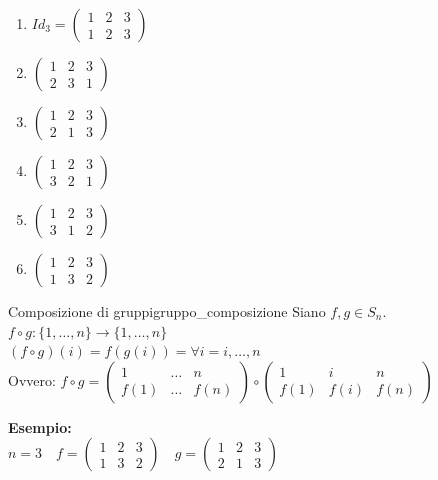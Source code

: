 \documentclass[12pt, letterpaper]{report}
\newcounter{definition}
\newcommand{\nmu}{}
\begin{document}
		\begin{enumerate}
			\item $Id_3 = \begin{pmatrix}
				1 & 2 & 3 \\
				1 & 2 & 3
			\end{pmatrix}$
			\item $\begin{pmatrix}
				1 & 2 & 3 \\
				2 & 3 & 1
			\end{pmatrix}$
			\item $\begin{pmatrix}
				1 & 2 & 3 \\
				2 & 1 & 3
			\end{pmatrix}$
			\item $\begin{pmatrix}
				1 & 2 & 3 \\
				3 & 2 & 1
			\end{pmatrix}$
			\item $\begin{pmatrix}
				1 & 2 & 3 \\
				3 & 1 & 2
			\end{pmatrix}$
			\item $\begin{pmatrix}
				1 & 2 & 3 \\
				1 & 3 & 2
			\end{pmatrix}$
		\end{enumerate}
		\begin{definition}{\nmu Composizione di gruppi}{gruppo_composizione}
			Siano $f,g \in S_n$. \\
			$f \circ g: \{1, \dots, n\} \to \{1, \dots, n\}$ \\
			$(f \circ g)(i) = f(g(i)) = \forall i = i, \dots, n$\\
			Ovvero: $f \circ g= \begin{pmatrix}
				1 & \dots &  n \\
				f(1) & \dots & f(n)
			\end{pmatrix} \circ \begin{pmatrix}
			1 & i & n \\
			f(1) & f(i) & f(n)
			\end{pmatrix}$
 		\end{definition}
 		\textbf{Esempio:} \\
 		$n = 3 \quad f=\begin{pmatrix}
 			1 & 2 & 3 \\
 			1 & 3 & 2
 		\end{pmatrix} \quad g = \begin{pmatrix}
 			1 & 2 & 3 \\
 			2 & 1 & 3
 		\end{pmatrix}$ \\
\end{document}
